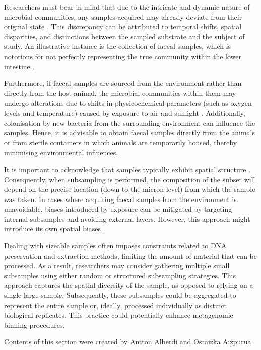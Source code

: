 \documentclass[
]{book}
\begin{document}
Researchers must bear in mind that due to the intricate and dynamic nature of microbial communities, any samples acquired may already deviate from their original state \citep{Probandt2018-mn}. This discrepancy can be attributed to temporal shifts, spatial disparities, and distinctions between the sampled substrate and the subject of study. An illustrative instance is the collection of faecal samples, which is notorious for not perfectly representing the true community within the lower intestine \citep{Yan2019-nb}.

Furthermore, if faecal samples are sourced from the environment rather than directly from the host animal, the microbial communities within them may undergo alterations due to shifts in physicochemical parameters (such as oxygen levels and temperature) caused by exposure to air and sunlight \citep{Fofanov2018-wu}. Additionally, colonisation by new bacteria from the surrounding environment can influence the samples. Hence, it is advisable to obtain faecal samples directly from the animals or from sterile containers in which animals are temporarily housed, thereby minimising environmental influences.

It is important to acknowledge that samples typically exhibit spatial structure \citep{Ji2019-wj}. Consequently, when subsampling is performed, the composition of the subset will depend on the precise location (down to the micron level) from which the sample was taken. In cases where acquiring faecal samples from the environment is unavoidable, biases introduced by exposure can be mitigated by targeting internal subsamples and avoiding external layers. However, this approach might introduce its own spatial biases \citep{Griffin2021-pt}.

Dealing with sizeable samples often imposes constraints related to DNA preservation and extraction methods, limiting the amount of material that can be processed. As a result, researchers may consider gathering multiple small subsamples using either random or structured subsampling strategies. This approach captures the spatial diversity of the sample, as opposed to relying on a single large sample. Subsequently, these subsamples could be aggregated to represent the entire sample or, ideally, processed individually as distinct biological replicates. This practice could potentially enhance metagenomic binning procedures.

Contents of this section were created by \protect\hyperlink{antton-alberdi}{Antton Alberdi} and \protect\hyperlink{ostaizka-aizpurua}{Ostaizka Aizpurua}.
\end{document}
